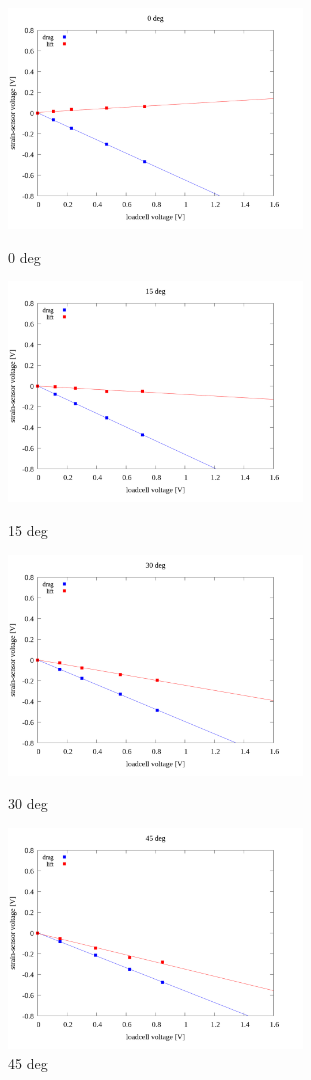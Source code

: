 \documentclass[twocolumn,a4j]{jsarticle}
\begin{document}
\begin{figure}[htbp]
    \footnotesize
    \begin{center}
        \includegraphics[width=78mm]{../images/linear/0_linear.png}
        \caption{0 deg}
        \includegraphics[width=78mm]{../images/linear/15_linear.png}
        \caption{15 deg}
        \includegraphics[width=78mm]{../images/linear/30_linear.png}
        \caption{30 deg}
        \includegraphics[width=78mm]{../images/linear/45_linear.png}
        \caption{45 deg}
    \end{center}
\end{figure}
\end{document}
